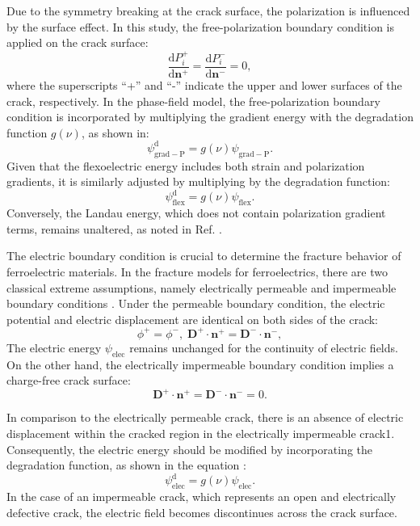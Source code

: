 \documentclass[times,fleqn,11pt]{elsarticle}
\begin{document}
Due to the symmetry breaking at the crack surface, the polarization is influenced by the surface effect. In this study, the free-polarization boundary condition is applied on the crack surface:
\begin{equation}
    \frac{\mathrm{d}P_i^+}{\mathrm{d}\mathbf{n}^+}=\frac{\mathrm{d}P_i^-}{\mathrm{d}\mathrm{\mathbf{n}^-}}=0,
\end{equation}
where the superscripts ``+'' and ``-'' indicate the upper and lower surfaces of the crack, respectively. In the phase-field model, the free-polarization boundary condition is incorporated by multiplying the gradient energy with the degradation function $g(\nu)$, as shown in:
\begin{equation}
    \psi_\mathrm{grad-P}^\mathrm{d}=g(\nu)\psi_\mathrm{grad-P}.
\end{equation}
Given that the flexoelectric energy includes both strain and polarization gradients, it is similarly adjusted by multiplying by the degradation function:
\begin{equation}
    \psi_{\mathrm{flex}}^\mathrm{d}=g(\nu) \psi_{\mathrm{flex}}.
\end{equation}
Conversely, the Landau energy, which does not contain polarization gradient terms, remains unaltered, as noted in Ref. \cite{abdollahi_phase-field_2011}.

The electric boundary condition is crucial to determine the fracture behavior of ferroelectric materials. In the fracture models for ferroelectrics, there are two classical extreme assumptions, namely electrically permeable and impermeable boundary conditions \cite{parton_fracture_1976,wilson_phase-field_2013}.
Under the permeable boundary condition, the electric potential and electric displacement are identical on both sides of the crack:
\begin{equation}
    \phi^+=\phi^-,\; \mathbf{D}^+\cdot\mathbf{n}^+=\mathbf{D}^-\cdot\mathbf{n}^-,
\end{equation}
The electric energy $\psi_{\mathrm{elec}}$ remains unchanged for the continuity of electric fields. On the other hand, the electrically impermeable boundary condition implies a charge-free crack surface:
\begin{equation}
    \mathbf{D}^+\cdot\mathbf{n}^+=\mathbf{D}^-\cdot\mathbf{n}^-=0.
\end{equation}

In comparison to the electrically permeable crack, there is an absence of electric displacement within the cracked region in the electrically impermeable crack1. Consequently, the electric energy should be modified by  incorporating the degradation function, as shown in the equation \cite{wang_effect_2010}:
\begin{equation}
    \psi_{\mathrm{elec}}^\mathrm{d}=g(\nu)\psi_{\mathrm{elec}}.
\end{equation}
In the case of an impermeable crack, which represents an open and electrically defective crack, the electric field becomes discontinues across the crack surface.
\end{document}
